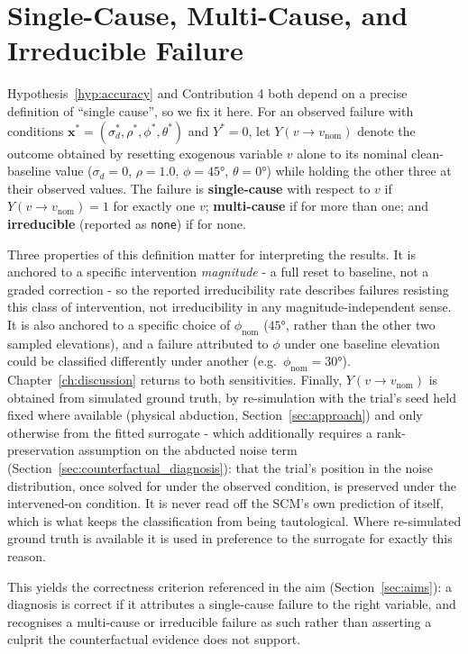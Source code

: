 \documentclass[11pt,a4paper]{report}
\begin{document}
\section{Single-Cause, Multi-Cause, and Irreducible Failure}
\label{sec:single_cause_def}

Hypothesis~\ref{hyp:accuracy} and Contribution 4 both depend on a precise definition of ``single cause'', so we fix it here. For an observed failure with conditions $\mathbf{x}^* = (\sigma_d^*,\rho^*,\phi^*,\theta^*)$ and $Y^*=0$, let $Y(v \!\to\! v_{\text{nom}})$ denote the outcome obtained by resetting exogenous variable $v$ alone to its nominal clean-baseline value ($\sigma_d = 0$, $\rho = 1.0$, $\phi = 45°$, $\theta = 0°$) while holding the other three at their observed values. The failure is \textbf{single-cause} with respect to $v$ if $Y(v \!\to\! v_{\text{nom}})=1$ for exactly one $v$; \textbf{multi-cause} if for more than one; and \textbf{irreducible} (reported as \texttt{none}) if for none.

Three properties of this definition matter for interpreting the results. It is anchored to a specific intervention \emph{magnitude} - a full reset to baseline, not a graded correction - so the reported irreducibility rate describes failures resisting this class of intervention, not irreducibility in any magnitude-independent sense. It is also anchored to a specific choice of $\phi_{\text{nom}}$ ($45°$, rather than the other two sampled elevations), and a failure attributed to $\phi$ under one baseline elevation could be classified differently under another (e.g.\ $\phi_{\text{nom}} = 30°$). Chapter~\ref{ch:discussion} returns to both sensitivities. Finally, $Y(v \!\to\! v_{\text{nom}})$ is obtained from simulated ground truth, by re-simulation with the trial's seed held fixed where available (physical abduction, Section~\ref{sec:approach}) and only otherwise from the fitted surrogate - which additionally requires a rank-preservation assumption on the abducted noise term (Section~\ref{sec:counterfactual_diagnosis}): that the trial's position in the noise distribution, once solved for under the observed condition, is preserved under the intervened-on condition. It is never read off the SCM's own prediction of itself, which is what keeps the classification from being tautological. Where re-simulated ground truth is available it is used in preference to the surrogate for exactly this reason.

This yields the correctness criterion referenced in the aim (Section~\ref{sec:aims}): a diagnosis is correct if it attributes a single-cause failure to the right variable, and recognises a multi-cause or irreducible failure as such rather than asserting a culprit the counterfactual evidence does not support.
\end{document}
